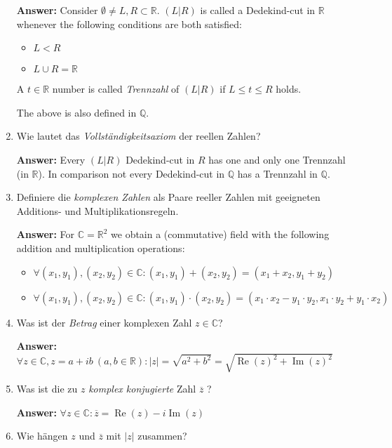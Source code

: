\documentclass[11pt]{article}
\newcommand{\abs}[1]{\left|#1\right|}
\newcommand{\RR}[0]{\mathbb{R}}
\newcommand{\CC}[0]{\mathbb{C}}
\newcommand{\QQ}[0]{\mathbb{Q}}
\renewcommand{\Re}[0]{\operatorname{Re}}
\renewcommand{\Im}[0]{\operatorname{Im}}
\begin{document}
\begin{enumerate}
    \textbf{Answer:} Consider $\emptyset \neq L, R \subset \RR$. $(L|R)$ is called a Dedekind-cut in $\RR$ whenever the following conditions are both satisfied:
    \begin{itemize}
        \item $L < R$
        \item $L \cup R = \RR$
    \end{itemize}

    A $t\in\RR$ number is called \textit{Trennzahl} of $(L|R)$ if $L \le t \le R$ holds.

    The above is also defined in $\QQ$.

    \item Wie lautet das \textit{Vollständigkeitsaxiom} der reellen Zahlen?

    \textbf{Answer:} Every $(L|R)$ Dedekind-cut in $R$ has one and only one Trennzahl (in $\RR$). In comparison not every Dedekind-cut in $\QQ$ has a Trennzahl in $\QQ$.

    \item Definiere die \textit{komplexen Zahlen} als Paare reeller Zahlen mit geeigneten Additions- und Multiplikationsregeln.

    \textbf{Answer:} For $\CC = \RR^2$ we obtain a (commutative) field with the following addition and multiplication operations:
    \begin{itemize}
        \item $\forall (x_1, y_1), (x_2, y_2) \in \CC\colon (x_1, y_1) + (x_2, y_2) = (x_1 + x_2, y_1 + y_2)$
        \item $\forall (x_1, y_1), (x_2, y_2) \in \CC\colon (x_1, y_1) \cdot (x_2, y_2) = (x_1\cdot x_2 - y_1\cdot y_2, x_1 \cdot y_2 + y_1 \cdot x_2)$
    \end{itemize}

    \item Was ist der \textit{Betrag} einer komplexen Zahl $z \in \CC$?

    \textbf{Answer:} $\forall z \in \CC, z = a + ib~(a, b\in \RR)\colon \abs{z} = \sqrt{a^2 + b^2} = \sqrt{\Re(z)^2 + \Im(z)^2}$

    \item Was ist die zu $z$ \textit{komplex konjugierte} Zahl $\overline{z}$ ?

    \textbf{Answer:} $\forall z \in \CC\colon \overline{z} = \Re(z) - i\Im(z)$

    \item Wie hängen $z$ und $\overline{z}$ mit $\abs{z}$ zusammen?


\end{enumerate}
\end{document}
